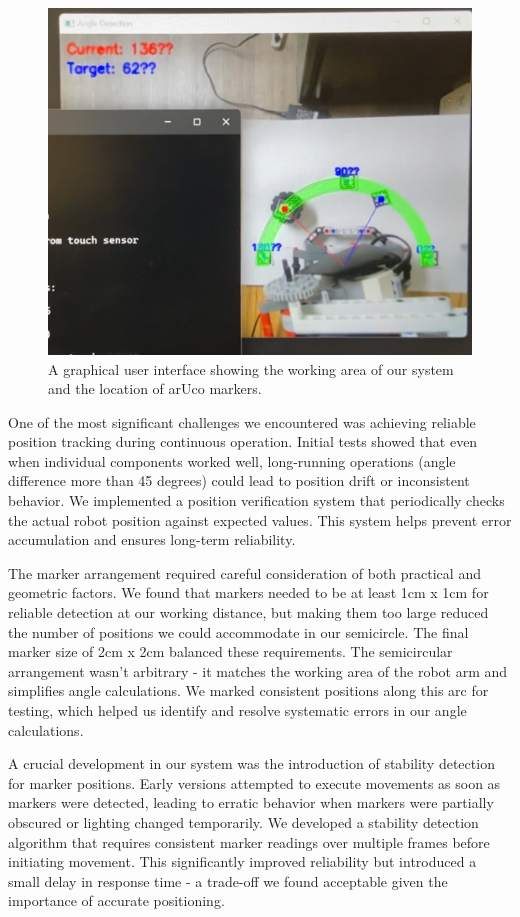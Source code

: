 \documentclass[10pt,twocolumn]{article}
\begin{document}
\begin{figure}
    \centering
    \includegraphics[width=.95\linewidth]{GUI.jpg}
    \caption{
        A graphical user interface showing the working area of our system and the location of arUco markers.
    }
    \label{fig:fourth-page}
\end{figure}

One of the most significant challenges we encountered was achieving reliable position tracking during continuous operation. Initial tests showed that even when individual components worked well, long-running operations (angle difference more than 45 degrees) could lead to position drift or inconsistent behavior. We implemented a position verification system that periodically checks the actual robot position against expected values. This system helps prevent error accumulation and ensures long-term reliability.

The marker arrangement required careful consideration of both practical and geometric factors. We found that markers needed to be at least 1cm x 1cm for reliable detection at our working distance, but making them too large reduced the number of positions we could accommodate in our semicircle. The final marker size of 2cm x 2cm balanced these requirements. The semicircular arrangement wasn't arbitrary - it matches the working area of the robot arm and simplifies angle calculations. We marked consistent positions along this arc for testing, which helped us identify and resolve systematic errors in our angle calculations.

A crucial development in our system was the introduction of stability detection for marker positions. Early versions attempted to execute movements as soon as markers were detected, leading to erratic behavior when markers were partially obscured or lighting changed temporarily. We developed a stability detection algorithm that requires consistent marker readings over multiple frames before initiating movement. This significantly improved reliability but introduced a small delay in response time - a trade-off we found acceptable given the importance of accurate positioning.
\end{document}
